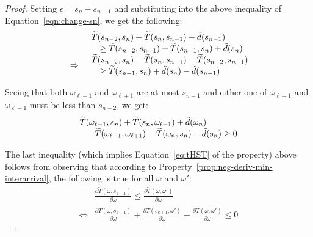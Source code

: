 \begin{proof}
\noindent Setting $\epsilon = s_{n} - s_{n-1}$ and substituting into the above inequality of Equation~\ref{eqn:change-sn}, we get the following:
\begin{equation}\label{eqn:change-sn2}
\begin{array}{ll}
     &\begin{array}{ll}
        \lefteqn{\widetilde{T}(s_{n-2},s_{n}) + \widetilde{T}(s_{n}, s_{n-1}) + \tilde{d}(s_{n-1})}& \\
        &\geq \widetilde{T}(s_{n-2},s_{n-1}) + \widetilde{T}(s_{n-1}, s_{n}) + \tilde{d}(s_{n}) 
    \end{array}\\
    \Rightarrow&
    \begin{array}{ll}
        \lefteqn{\widetilde{T}(s_{n-2},s_{n}) + \widetilde{T}(s_{n}, s_{n-1}) - \widetilde{T}(s_{n-2},s_{n-1})}& \\
        &\geq \widetilde{T}(s_{n-1}, s_{n}) + \tilde{d}(s_{n}) - \tilde{d}(s_{n-1})
    \end{array}\\
\end{array}
\end{equation}

Seeing that both $\omega_{\ell-1}$ and $\omega_{\ell+1}$ are at most $s_{n-1}$ and either one of $\omega_{\ell-1}$ and $\omega_{\ell+1}$  must be less than $s_{n-2}$, we get:
\begin{equation}
\begin{array}{ll}
    \lefteqn{\widetilde{T}(\omega_{\ell-1}, s_n)  +\widetilde{T}(s_n,\omega_{\ell+1}) + \tilde{d}(\omega_n)} &\\
    &- \widetilde{T}(\omega_{\ell-1},\omega_{\ell+1}) - \widetilde{T}(\omega_n, s_{n})  - \tilde{d}(s_n) \geq 0
\end{array}
\end{equation}

\noindent The last inequality (which implies Equation~\ref{eq:tHST} of the property) above follows from observing that according to Property~\ref{prop:neg-deriv-min-interarrival}, the following is true for all $\omega$ and $\omega'$:
\begin{equation}
\begin{array}{ll}
        &\frac{\partial \widetilde{T}(\omega,s_{k+1})}{\partial \omega}
            \leq \frac{\partial \widetilde{T}(\omega,\omega')}{\partial \omega} \nonumber\\
        \Leftrightarrow&
        \frac{\partial \widetilde{T}(\omega,s_{k+1})}{\partial \omega} + \frac{\partial \widetilde{T}(s_{k+1},\omega')}{\partial \omega} - \frac{\partial \widetilde{T}(\omega,\omega')}{\partial \omega} \leq 0 \nonumber  
\end{array}
\end{equation}
\end{proof}

